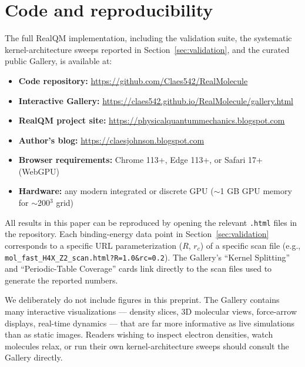 \documentclass[11pt]{article}
\begin{document}
\section{Code and reproducibility}\label{sec:code}

The full RealQM implementation, including the validation suite, the systematic kernel-architecture sweeps reported in Section~\ref{sec:validation}, and the curated public Gallery, is available at:

\begin{itemize}
\item \textbf{Code repository:} \url{https://github.com/Claes542/RealMolecule}
\item \textbf{Interactive Gallery:} \url{https://claes542.github.io/RealMolecule/gallery.html}
\item \textbf{RealQM project site:} \url{https://physicalquantummechanics.blogspot.com}
\item \textbf{Author's blog:} \url{https://claesjohnson.blogspot.com}
\item \textbf{Browser requirements:} Chrome 113+, Edge 113+, or Safari 17+ (WebGPU)
\item \textbf{Hardware:} any modern integrated or discrete GPU ($\sim$1 GB GPU memory for $\sim$200$^3$ grid)
\end{itemize}

All results in this paper can be reproduced by opening the relevant \texttt{.html} files in the repository. Each binding-energy data point in Section~\ref{sec:validation} corresponds to a specific URL parameterization ($R$, $r_c$) of a specific scan file (e.g., \texttt{mol\_fast\_H4X\_Z2\_scan.html?R=1.0\&rc=0.2}). The Gallery's ``Kernel Splitting'' and ``Periodic-Table Coverage'' cards link directly to the scan files used to generate the reported numbers.

We deliberately do not include figures in this preprint. The Gallery contains many interactive visualizations --- density slices, 3D molecular views, force-arrow displays, real-time dynamics --- that are far more informative as live simulations than as static images. Readers wishing to inspect electron densities, watch molecules relax, or run their own kernel-architecture sweeps should consult the Gallery directly.
\end{document}

